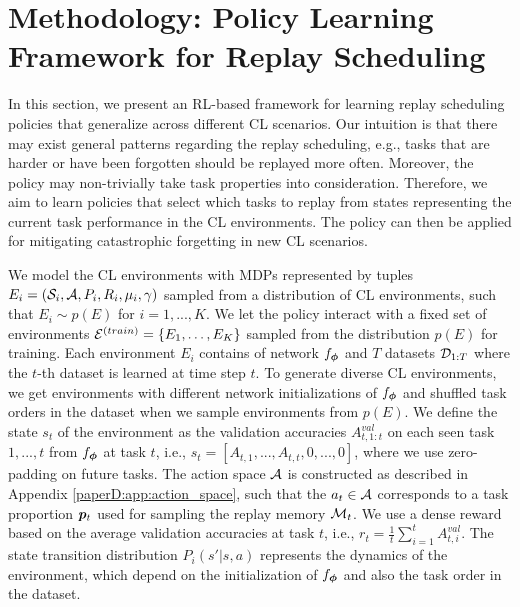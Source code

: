 
\section{Methodology: Policy Learning Framework for Replay Scheduling}\label{paperD:sec:methodology}

In this section, we present an RL-based framework for learning replay scheduling policies that generalize across different CL scenarios. Our intuition is that there may exist general patterns regarding the replay scheduling, e.g., tasks that are harder or have been forgotten should be replayed more often. Moreover, the policy may non-trivially take task properties into consideration. Therefore, we aim to learn policies that select which tasks to replay from states representing the current task performance in the CL environments. The policy can then be applied for mitigating catastrophic forgetting in new CL scenarios. 


We model the CL environments with MDPs represented by tuples $E_i = ({\mathcal{S}}_i, {\mathcal{A}}, P_i, R_i, \mu_i, \gamma)$ sampled from a distribution of CL environments, such that $E_i \sim p(E)$ for $i=1, ..., K$. We let the policy interact with a fixed set of environments ${\mathcal{E}}^{(train)} = \{E_1, \dots, E_K\}$ sampled from the distribution $p(E)$ for training. 
Each environment $E_i$ contains of network $f_{{\bm{\phi}}}$ and $T$ datasets ${\mathcal{D}}_{1:T}$ where the $t$-th dataset is learned at time step $t$. To generate diverse CL environments, we get environments with different network initializations of $f_{{\bm{\phi}}}$ and shuffled task orders in the dataset when we sample environments from $p(E)$. 
We define the state $s_t$ of the environment as the validation accuracies $A_{t, 1:t}^{val}$ on each seen task $1, ..., t$ from $f_{{\bm{\phi}}}$ at task $t$, i.e., $s_t = [A_{t, 1}, ..., A_{t, t}, 0, ..., 0]$, where we use zero-padding on future tasks. The action space ${\mathcal{A}}$ is constructed as described in Appendix \ref{paperD:app:action_space}, such that the $a_t \in {\mathcal{A}}$ corresponds to a task proportion ${\bm{p}}_t$ used for sampling the replay memory ${\mathcal{M}}_t$. We use a dense reward based on the average validation accuracies at task $t$, i.e., $r_{t} = \frac{1}{t}\sum_{i=1}^{t} A_{t, i}^{val}$. The state transition distribution $P_i(s' | s, a)$ represents the dynamics of the environment, which depend on the initialization of $f_{{\bm{\phi}}}$ and also the task order in the dataset. 

